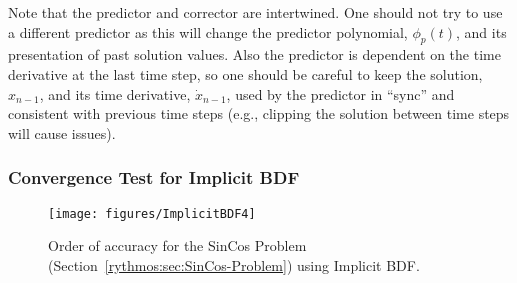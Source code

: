 Note that the predictor and corrector are intertwined. One should
not try to use a different predictor as this will change the predictor
polynomial, $\phi_{p}(t)$, and its presentation of past solution
values. Also the predictor is dependent on the time derivative at
the last time step, so one should be careful to keep the solution,
$x_{n-1}$, and its time derivative, $\dot{x}_{n-1}$, used by the
predictor in ``sync'' and consistent with previous time steps (e.g.,
clipping the solution between time steps will cause issues).

\subsubsection{Convergence Test for Implicit BDF}

\begin{figure}[H]
\centering{}\texttt{[image: figures/ImplicitBDF4]}\caption{Order of accuracy for the SinCos Problem (Section~\ref{rythmos:sec:SinCos-Problem})
using Implicit BDF.}
\end{figure}

